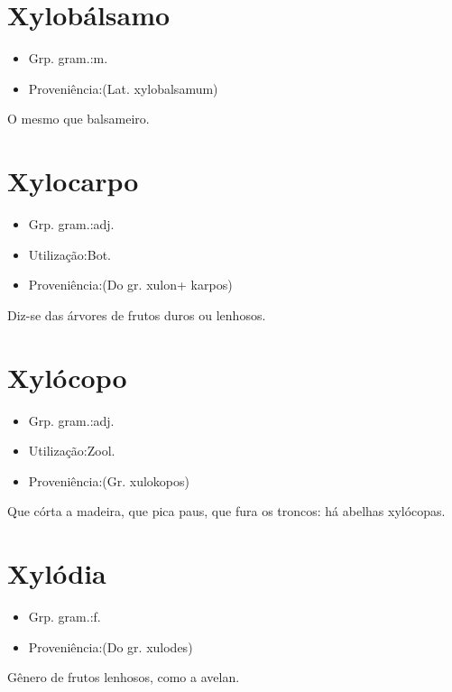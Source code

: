 \section{Xylobálsamo}
\begin{itemize}
\item {Grp. gram.:m.}
\end{itemize}
\begin{itemize}
\item {Proveniência:(Lat. \textunderscore xylobalsamum\textunderscore )}
\end{itemize}
O mesmo que \textunderscore balsameiro\textunderscore .
\section{Xylocarpo}
\begin{itemize}
\item {Grp. gram.:adj.}
\end{itemize}
\begin{itemize}
\item {Utilização:Bot.}
\end{itemize}
\begin{itemize}
\item {Proveniência:(Do gr. \textunderscore xulon\textunderscore  + \textunderscore karpos\textunderscore )}
\end{itemize}
Diz-se das árvores de frutos duros ou lenhosos.
\section{Xylócopo}
\begin{itemize}
\item {Grp. gram.:adj.}
\end{itemize}
\begin{itemize}
\item {Utilização:Zool.}
\end{itemize}
\begin{itemize}
\item {Proveniência:(Gr. \textunderscore xulokopos\textunderscore )}
\end{itemize}
Que córta a madeira, que pica paus, que fura os troncos: \textunderscore há abelhas xylócopas\textunderscore .
\section{Xylódia}
\begin{itemize}
\item {Grp. gram.:f.}
\end{itemize}
\begin{itemize}
\item {Proveniência:(Do gr. \textunderscore xulodes\textunderscore )}
\end{itemize}
Gênero de frutos lenhosos, como a avelan.

